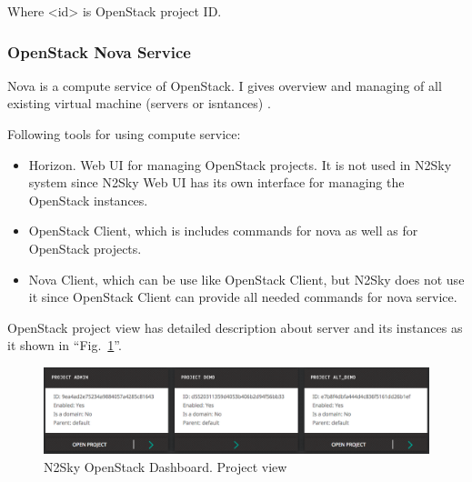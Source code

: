 Where <id> is OpenStack project ID.

\subsubsection{OpenStack Nova Service}\label{OpenStack Nova Service}

Nova is a compute service of OpenStack. I gives overview and managing of all existing virtual machine (servers or isntances) \cite{Markelov2016}. 

Following tools for using compute service:
\begin{itemize}
\item Horizon. Web UI for managing OpenStack projects. It is not used in N2Sky system since N2Sky Web UI has its own interface for managing the OpenStack instances.
\item OpenStack Client, which is includes commands for nova as well as for OpenStack projects.
\item Nova Client, which can be use like OpenStack Client, but N2Sky does not use it since OpenStack Client can provide all needed commands for nova service. 
\end{itemize}


OpenStack project view has detailed description about server and its instances as it shown in ``Fig.~\ref{fig:openstack_dashboard_projects}''. 

\begin{figure}[htbp]
\begin{center}
  \includegraphics[width=\linewidth]{components/4/pics/openstack_dashboard_projects.png}
  \caption{N2Sky OpenStack Dashboard. Project view}
  \label{fig:openstack_dashboard_projects}
\end{center}
\end{figure}

